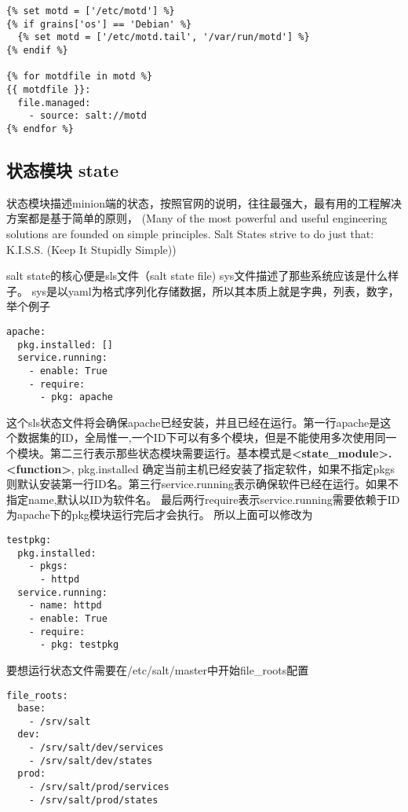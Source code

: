 \begin{lstlisting}
{% set motd = ['/etc/motd'] %}
{% if grains['os'] == 'Debian' %}
  {% set motd = ['/etc/motd.tail', '/var/run/motd'] %}
{% endif %}

{% for motdfile in motd %}
{{ motdfile }}:
  file.managed:
    - source: salt://motd
{% endfor %}
\end{lstlisting}

\subsection{状态模块 state}

状态模块描述minion端的状态，按照官网的说明，往往最强大，最有用的工程解决方案都是基于简单的原则，
(Many of the most powerful and useful engineering solutions are founded on simple principles. Salt States strive to do just that: K.I.S.S. (Keep It Stupidly Simple))

salt state的核心便是sls文件（salt state file) sys文件描述了那些系统应该是什么样子。 sys是以yaml为格式序列化存储数据，所以其本质上就是字典，列表，数字，举个例子

\begin{lstlisting}
apache:
  pkg.installed: []
  service.running:
    - enable: True
    - require:
      - pkg: apache
\end{lstlisting}

这个sls状态文件将会确保apache已经安装，并且已经在运行。第一行apache是这个数据集的ID，全局惟一,一个ID下可以有多个模块，但是不能使用多次使用同一个模块。第二三行表示那些状态模块需要运行。基本模式是\textbf{<state_module>.<function>}, pkg.installed 确定当前主机已经安装了指定软件，如果不指定pkgs则默认安装第一行ID名。第三行service.running表示确保软件已经在运行。如果不指定name,默认以ID为软件名。
最后两行require表示service.running需要依赖于ID为apache下的pkg模块运行完后才会执行。 所以上面可以修改为

\begin{lstlisting}
testpkg:
  pkg.installed:
    - pkgs:
      - httpd
  service.running:
    - name: httpd
    - enable: True
    - require:
      - pkg: testpkg
\end{lstlisting}


要想运行状态文件需要在/etc/salt/master中开始file_roots配置
\begin{lstlisting}
file_roots:
  base:
    - /srv/salt
  dev:
    - /srv/salt/dev/services
    - /srv/salt/dev/states
  prod:
    - /srv/salt/prod/services
    - /srv/salt/prod/states
\end{lstlisting}


